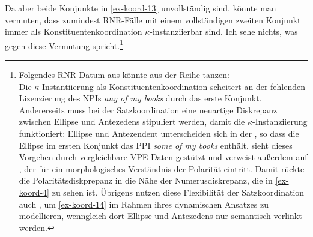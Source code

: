 Da aber beide Konjunkte in \ref{ex-koord-13} unvollständig sind, könnte man vermuten, dass zumindest RNR-Fälle mit einem vollständigen zweiten Konjunkt immer als Konstituentenkoordination $\kappa$-instanziierbar sind. Ich sehe nichts, was gegen diese Vermutung spricht.\footnote{Folgendes RNR-Datum aus \citet[(23a)]{Cann:etal:05b} könnte aus der Reihe tanzen:\\
Die $\kappa$-Instantiierung als Konstituentenkoordination scheitert an der fehlenden Lizenzierung des NPIs {\it any of my books} durch das erste Konjunkt. Andererseits muss bei der Satzkoordination eine neuartige Diskrepanz zwischen Ellipse und Antezedens stipuliert werden, damit die $\kappa$-Instanziierung funktioniert: Ellipse und Antezendent unterscheiden sich in der , so dass die Ellipse im ersten Konjunkt das PPI {\it some of my books} enthält. \citet[81f]{Ha:08} sieht dieses Vorgehen durch vergleichbare VPE-Daten gestützt und verweist au\ss erdem auf \cite{Klima:64}, der für ein morphologisches Verständnis der Polarität eintritt. Damit rückte die Polaritätsdiskprepanz in die Nähe der Numerusdiskrepanz, die in \ref{ex-koord-4} zu sehen ist. Übrigens nutzen diese Flexibilität der Satzkoordination auch \cite{Cann:etal:05b}, um \ref{ex-koord-14} im Rahmen ihres dynamischen Ansatzes zu modellieren, wenngleich dort Ellipse und Antezedens nur semantisch verlinkt werden.
}

